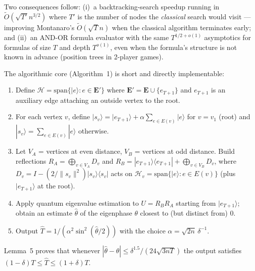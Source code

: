 \documentclass[11pt]{article}
\begin{document}
Two consequences follow: (i)~a backtracking-search speedup running in
$\tilde O(\sqrt{T'} n^{3/2})$ where $T'$ is the number of nodes the
\emph{classical} search would visit --- improving Montanaro's
$\tilde O(\sqrt{T} n)$ when the classical algorithm terminates early; and
(ii)~an AND-OR formula evaluator with the same $T^{1/2+o(1)}$ asymptotics for
formulas of size $T$ and depth $T^{o(1)}$, even when the formula's structure
is not known in advance (position trees in 2-player games).

The algorithmic core (Algorithm~1) is short and directly implementable:
\begin{enumerate}
  \item Define $\mathcal H = \mathrm{span}\{|e\rangle : e \in \mathbf E'\}$ where
        $\mathbf E' = \mathbf E \cup \{e_{T+1}\}$ and $e_{T+1}$ is an auxiliary
        edge attaching an outside vertex to the root.
  \item For each vertex $v$, define
        $|s_v\rangle = |e_{T+1}\rangle + \alpha \sum_{e \in E(v)}|e\rangle$
        for $v = v_1$ (root) and
        $|s_v\rangle = \sum_{e \in E(v)}|e\rangle$ otherwise.
  \item Let $V_A$ = vertices at even distance, $V_B$ = vertices at odd distance.
        Build reflections $R_A = \bigoplus_{v \in V_A} D_v$ and
        $R_B = |e_{T+1}\rangle\langle e_{T+1}| + \bigoplus_{v \in V_B} D_v$,
        where $D_v = I - (2/\|s_v\|^2) |s_v\rangle\langle s_v|$ acts on
        $\mathcal H_v = \mathrm{span}\{|e\rangle : e \in E(v)\}$ (plus $|e_{T+1}\rangle$ at the root).
  \item Apply quantum eigenvalue estimation to $U = R_B R_A$ starting from
        $|e_{T+1}\rangle$; obtain an estimate $\hat\theta$ of the eigenphase
        $\theta$ closest to (but distinct from) $0$.
  \item Output $\hat T = 1/(\alpha^2 \sin^2(\hat\theta/2))$ with the choice
        $\alpha = \sqrt{2n}\,\delta^{-1}$.
\end{enumerate}
Lemma~5 proves that whenever
$|\hat\theta - \theta| \le \delta^{1.5}/(24\sqrt{3nT})$ the output satisfies
$(1-\delta) T \le \hat T \le (1+\delta) T$.
\end{document}
